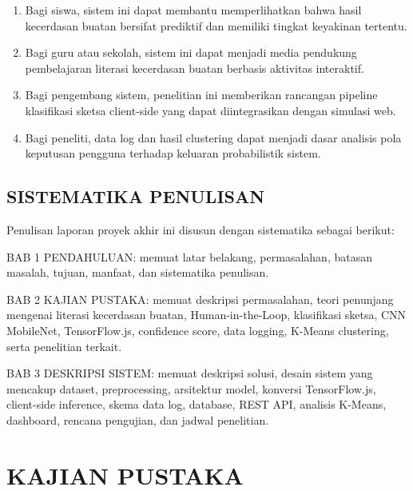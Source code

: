 \documentclass[12pt,oneside]{report}
\begin{document}
\begin{enumerate}
\item Bagi siswa, sistem ini dapat membantu memperlihatkan bahwa hasil kecerdasan buatan bersifat prediktif dan memiliki tingkat keyakinan tertentu.
\item Bagi guru atau sekolah, sistem ini dapat menjadi media pendukung pembelajaran literasi kecerdasan buatan berbasis aktivitas interaktif.
\item Bagi pengembang sistem, penelitian ini memberikan rancangan pipeline klasifikasi sketsa client-side yang dapat diintegrasikan dengan simulasi web.
\item Bagi peneliti, data log dan hasil clustering dapat menjadi dasar analisis pola keputusan pengguna terhadap keluaran probabilistik sistem.
\end{enumerate}

\section{SISTEMATIKA PENULISAN}
\label{sec:sistematika-penulisan}

Penulisan laporan proyek akhir ini disusun dengan sistematika sebagai berikut:

BAB 1 PENDAHULUAN: memuat latar belakang, permasalahan, batasan masalah, tujuan, manfaat, dan sistematika penulisan.

BAB 2 KAJIAN PUSTAKA: memuat deskripsi permasalahan, teori penunjang mengenai literasi kecerdasan buatan, Human-in-the-Loop, klasifikasi sketsa, CNN MobileNet, TensorFlow.js, confidence score, data logging, K-Means clustering, serta penelitian terkait.

BAB 3 DESKRIPSI SISTEM: memuat deskripsi solusi, desain sistem yang mencakup dataset, preprocessing, arsitektur model, konversi TensorFlow.js, client-side inference, skema data log, database, REST API, analisis K-Means, dashboard, rencana pengujian, dan jadwal penelitian.


\chapter{KAJIAN PUSTAKA}
\label{chap:bab2}
\end{document}
